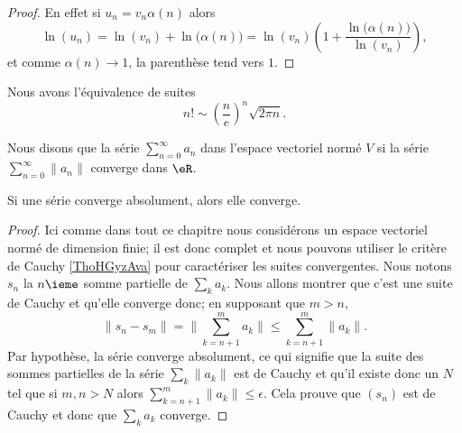 \begin{proof}
    En effet si \( u_n=v_n\alpha(n)\) alors
    \begin{equation}
        \ln(u_n)=\ln(v_n)+\ln\big( \alpha(n) \big)=\ln(v_n)\left( 1+\frac{ \ln\big( \alpha(n) \big) }{ \ln(v_n) } \right),
    \end{equation}
    et comme \( \alpha(n)\to 1\), la parenthèse tend vers \( 1\).
\end{proof}

\begin{lemma}        \label{LemCEoBqrP}
    Nous avons l'équivalence de suites
    \begin{equation}
        n!\sim \left( \frac{ n }{ e } \right)^n\sqrt{2\pi n}.
    \end{equation}
\end{lemma}

\begin{definition}
    Nous disons que la série \( \sum_{n=0}^{\infty}a_n\) dans l'espace vectoriel normé \( V\)  si la série \( \sum_{n=0}^{\infty}\| a_n \|\) converge dans \( \eR\).
\end{definition}

\begin{lemma}   \label{LemNEoaaPt}
    Si une série converge absolument, alors elle converge.
\end{lemma}

\begin{proof}
    Ici comme dans tout ce chapitre nous considérons un espace vectoriel normé de dimension finie; il est donc complet et nous pouvons utiliser le critère de Cauchy \ref{ThoHGyzAva} pour caractériser les suites convergentes. Nous notons \( s_n\) la \( n\ieme\) somme partielle de \( \sum_k a_k\). Nous allons montrer que c'est une suite de Cauchy et qu'elle converge donc; en supposant que \( m>n\),
    \begin{equation}
        \| s_n-s_m \|=\| \sum_{k=n+1}^m a_k \|\leq \sum_{k=n+1}^m\| a_k \|.
    \end{equation}
    Par hypothèse, la série converge absolument, ce qui signifie que la suite des sommes partielles de la série \( \sum_k\| a_k \|\) est de Cauchy et qu'il existe donc un \( N\) tel que si \( m,n>N\) alors \( \sum_{k=n+1}^m\| a_k \|\leq \epsilon\). Cela prouve que \( (s_n)\) est de Cauchy et donc que \( \sum_ka_k\) converge.
\end{proof}

